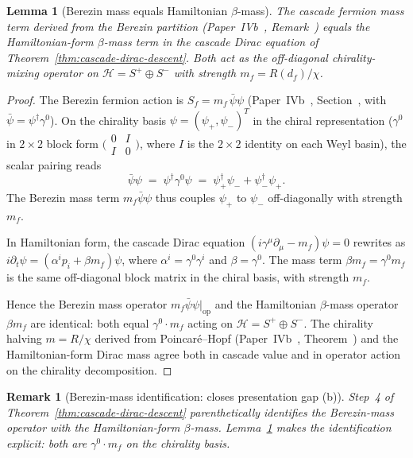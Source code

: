 \documentclass[12pt,a4paper]{article}
\newtheorem{lemma}[theorem]{Lemma}
\newtheorem*{remark}{Remark}
\begin{document}
\begin{lemma}[Berezin mass equals Hamiltonian $\beta$-mass]\label{lem:berezin-equals-beta-mass}
The cascade fermion mass term derived from the Berezin partition
(Paper~IVb~\cite{part4b},
Remark~) equals the
Hamiltonian-form $\beta$-mass term in the cascade Dirac equation
of Theorem~\ref{thm:cascade-dirac-descent}. Both act as the
off-diagonal chirality-mixing operator on
$\mathcal{H} = S^+ \oplus S^-$ with strength
$m_f = R(d_f)/\chi$.
\end{lemma}

\begin{proof}
The Berezin fermion action is $S_f = m_f\,\bar\psi\psi$
(Paper~IVb~\cite{part4b}, Section~, with
$\bar\psi = \psi^\dagger\gamma^0$). On the chirality basis
$\psi = (\psi_+, \psi_-)^T$ in the chiral representation
($\gamma^0$ in $2\times 2$ block form
$\bigl(\begin{smallmatrix} 0 & I \\ I & 0 \end{smallmatrix}\bigr)$,
where $I$ is the $2\times 2$ identity on each Weyl basin), the
scalar pairing reads
\[
\bar\psi\psi \;=\; \psi^\dagger\gamma^0\psi
\;=\; \psi_+^\dagger\psi_- + \psi_-^\dagger\psi_+.
\]
The Berezin mass term $m_f\bar\psi\psi$ thus couples $\psi_+$ to
$\psi_-$ off-diagonally with strength $m_f$.

In Hamiltonian form, the cascade Dirac equation
$(i\gamma^\mu\partial_\mu - m_f)\psi = 0$ rewrites as
$i\partial_t\psi = (\alpha^i p_i + \beta m_f)\psi$, where
$\alpha^i = \gamma^0\gamma^i$ and $\beta = \gamma^0$. The mass
term $\beta m_f = \gamma^0 m_f$ is the same off-diagonal block
matrix in the chiral basis, with strength $m_f$.

Hence the Berezin mass operator $m_f\bar\psi\psi\big|_{\text{op}}$
and the Hamiltonian $\beta$-mass operator $\beta m_f$ are identical:
both equal $\gamma^0\cdot m_f$ acting on
$\mathcal{H} = S^+ \oplus S^-$. The chirality halving
$m = R/\chi$ derived from Poincar\'e--Hopf
(Paper~IVb~\cite{part4b},
Theorem~) and the Hamiltonian-form Dirac
mass agree both in cascade value and in operator action on the
chirality decomposition.
\end{proof}

\begin{remark}[Berezin-mass identification: closes presentation gap (b)]\label{rem:b-closed}
Step~4 of Theorem~\ref{thm:cascade-dirac-descent} parenthetically
identifies the Berezin-mass operator with the Hamiltonian-form
$\beta$-mass. Lemma~\ref{lem:berezin-equals-beta-mass} makes the
identification explicit: both are $\gamma^0\cdot m_f$ on the
chirality basis.
\end{remark}
\end{document}
